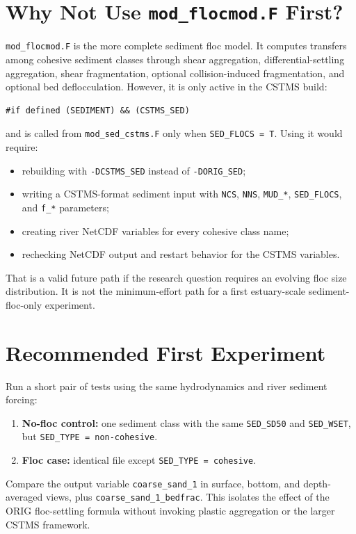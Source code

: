 \documentclass[11pt]{article}
\begin{document}
\section*{Why Not Use \texttt{mod\_flocmod.F} First?}

\texttt{mod\_flocmod.F} is the more complete sediment floc model.  It computes
transfers among cohesive sediment classes through shear aggregation,
differential-settling aggregation, shear fragmentation, optional
collision-induced fragmentation, and optional bed deflocculation.  However, it
is only active in the CSTMS build:
\begin{verbatim}
#if defined (SEDIMENT) && (CSTMS_SED)
\end{verbatim}
and is called from \texttt{mod\_sed\_cstms.F} only when \texttt{SED\_FLOCS =
T}.  Using it would require:
\begin{itemize}
  \item rebuilding with \texttt{-DCSTMS\_SED} instead of \texttt{-DORIG\_SED};
  \item writing a CSTMS-format sediment input with \texttt{NCS}, \texttt{NNS},
        \texttt{MUD\_*}, \texttt{SED\_FLOCS}, and \texttt{f\_*} parameters;
  \item creating river NetCDF variables for every cohesive class name;
  \item rechecking NetCDF output and restart behavior for the CSTMS variables.
\end{itemize}

That is a valid future path if the research question requires an evolving floc
size distribution.  It is not the minimum-effort path for a first estuary-scale
sediment-floc-only experiment.

\section*{Recommended First Experiment}

Run a short pair of tests using the same hydrodynamics and river sediment
forcing:
\begin{enumerate}[(1)]
  \item \textbf{No-floc control:} one sediment class with the same
        \texttt{SED\_SD50} and \texttt{SED\_WSET}, but
        \texttt{SED\_TYPE = non-cohesive}.
  \item \textbf{Floc case:} identical file except
        \texttt{SED\_TYPE = cohesive}.
\end{enumerate}

Compare the output variable \texttt{coarse\_sand\_1} in surface, bottom, and
depth-averaged views, plus \texttt{coarse\_sand\_1\_bedfrac}.  This isolates
the effect of the ORIG floc-settling formula without invoking plastic
aggregation or the larger CSTMS framework.
\end{document}
